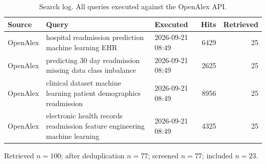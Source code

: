 \begin{table}[htbp]
\centering
\caption{Search log. All queries executed against the OpenAlex API.}
\label{tab:searchlog}
\small
\begin{tabular}{p{1.8cm}p{5.2cm}p{2.1cm}rr}
\toprule
Source & Query & Executed & Hits & Retrieved \\
\midrule
OpenAlex & hospital readmission prediction machine learning EHR & 2026-09-21 08:49 & 6429 & 25 \\
OpenAlex & predicting 30 day readmission missing data class imbalance & 2026-09-21 08:49 & 2625 & 25 \\
OpenAlex & clinical dataset machine learning patient demographics readmission & 2026-09-21 08:49 & 8956 & 25 \\
OpenAlex & electronic health records readmission feature engineering machine learning & 2026-09-21 08:49 & 4325 & 25 \\
\bottomrule
\end{tabular}

\vspace{0.5em}
{\small Retrieved $n=100$; after deduplication $n=77$; screened $n=77$; included $n=23$.}
\end{table}
